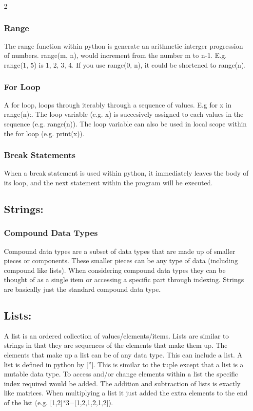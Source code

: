 \documentclass[a4paper]{report}
\begin{document}
\begin{flushleft}
\begin{multicols}{2}
	\subsubsection*{Range}
	The range function within python is generate an arithmetic interger progression of numbers. range(m, n), would increment from the number m to n-1. E.g. range(1, 5) is 1, 2, 3,  4. If you use range(0, n), it could be shortened to range(n).
	\subsubsection*{For Loop}
	A for loop, loops through iterably through a sequence of values. E.g for x in range(n):. The loop variable (e.g. x) is succesively assigned to each values in the sequence (e.g. range(n)). The loop variable can also be used in local scope within the for loop (e.g. print(x)).
	\subsubsection*{Break Statements}
	When a break statement is used within python, it immediately leaves the body of its loop, and the next statement within the program will be executed.

	\subsection*{Strings:}
	\subsubsection*{Compound Data Types}
	Compound data types are a subset of data types that are made up of smaller pieces or components. These smaller pieces can be any type of data (including compound like lists). When considering compound data types they can be thought of as a single item or accessing a specific part through indexing. Strings are basically just the standard compound data type.
	\subsection*{Lists:}
	A list is an ordered collection of values/elements/items. Lists are similar to strings in that they are sequences of the elements that make them up. The elements that make up a list can be of any data type. This can include a list. A list is defined in python by ['']. This is similar to the tuple except that a list is a mutable data type. To access and/or change elements within a list the specific index required would be added. The addition and subtraction of lists is exactly like matrices. When multiplying a list it just added the extra elements to the end of the list (e.g. [1,2]*3=[1,2,1,2,1,2]).


\end{multicols}
\end{flushleft}
\end{document}
